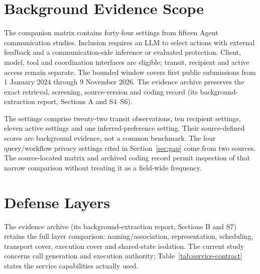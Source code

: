 \appendices
\section{Background Evidence Scope}\label{app:map}
The companion matrix contains forty-four settings from fifteen Agent communication studies. Inclusion requires an LLM to select actions with external feedback and a communication-side inference or evaluated protection. Client, model, tool and coordination interfaces are eligible; transit, recipient and active access remain separate. The bounded window covers first public submissions from 1 January 2024 through 9 November 2026. The evidence archive preserves the exact retrieval, screening, source-version and coding record (its background-extraction report, Sections A and S4--S6).

The settings comprise twenty-two transit observations, ten recipient settings, eleven active settings and one inferred-preference setting. Their source-defined scores are background evidence, not a common benchmark. The four query/workflow privacy settings cited in Section~\ref{sec:gap} come from two sources. The source-located matrix and archived coding record permit inspection of that narrow comparison without treating it as a field-wide frequency.

\section{Defense Layers}\label{app:defense}
The evidence archive (its background-extraction report, Sections B and S7) retains the full layer comparison: naming/association, representation, scheduling, transport cover, execution cover and shared-state isolation. The current study concerns call generation and execution authority; Table~\ref{tab:service-contract} states the service capabilities actually used.
